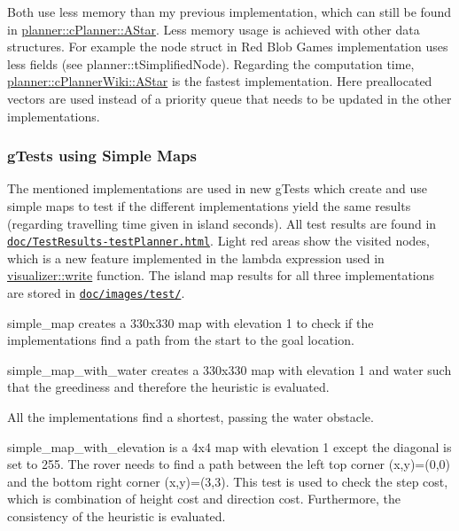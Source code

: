 Both use less memory than my previous implementation, which can still be found in \mbox{\hyperlink{classplanner_1_1c_planner_a341e70531266f023ac9461d18979d1ef}{planner\+::c\+Planner\+::\+A\+Star}}. Less memory usage is achieved with other data structures. For example the node struct in Red Blob Games implementation uses less fields (see planner\+::t\+Simplified\+Node). Regarding the computation time, \mbox{\hyperlink{classplanner_1_1c_planner_wiki_a2652cf0e84d0a1fcd17e6c4288179955}{planner\+::c\+Planner\+Wiki\+::\+A\+Star}} is the fastest implementation. Here preallocated vectors are used instead of a priority queue that needs to be updated in the other implementations.

\subsubsection*{g\+Tests using Simple Maps}

The mentioned implementations are used in new g\+Tests which create and use simple maps to test if the different implementations yield the same results (regarding travelling time given in island seconds). All test results are found in \href{doc/TestResults-testPlanner.html}{\tt doc/\+Test\+Results-\/test\+Planner.\+html}. Light red areas show the visited nodes, which is a new feature implemented in the lambda expression used in {\ttfamily \mbox{\hyperlink{namespacevisualizer_a2f66e38c689ff3c3731faa95739bbf25}{visualizer\+::write}}} function. The island map results for all three implementations are stored in \href{doc/images/test/}{\tt doc/images/test/}.


\begin{DoxyEnumerate}
\item simple\+\_\+map creates a 330x330 map with elevation 1 to check if the implementations find a path from the start to the goal location.
\end{DoxyEnumerate}




\begin{DoxyEnumerate}
\item simple\+\_\+map\+\_\+with\+\_\+water creates a 330x330 map with elevation 1 and water such that the greediness and therefore the heuristic is evaluated.
\end{DoxyEnumerate}



All the implementations find a shortest, passing the water obstacle.


\begin{DoxyEnumerate}
\item simple\+\_\+map\+\_\+with\+\_\+elevation is a 4x4 map with elevation 1 except the diagonal is set to 255. The rover needs to find a path between the left top corner (x,y)=(0,0) and the bottom right corner (x,y)=(3,3). This test is used to check the step cost, which is combination of height cost and direction cost. Furthermore, the consistency of the heuristic is evaluated.
\end{DoxyEnumerate}




